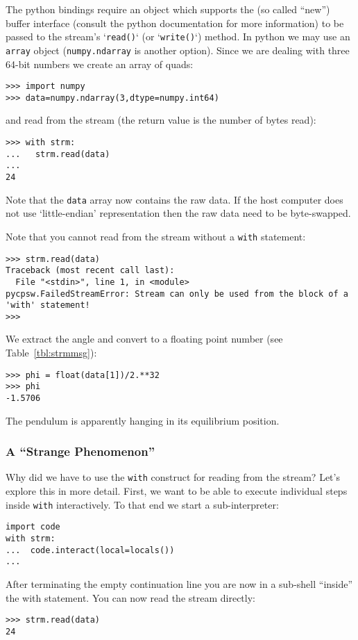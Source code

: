 \documentclass[10pt]{article}
\newcommand{\py}        {python}
\newcommand{\pyt}       {python}
\newcommand{\cod}[1] {{\tt#1}}
\begin{document}
The \py{} bindings require an object which supports the (so called ``new'') buffer
interface (consult the \py{} documentation for more information) to be passed to
the stream's `\cod{read()}` (or `\cod{write()}`) method.
In \pyt{} we may use an \cod{array} object (\cod{numpy.ndarray} is another option).
Since we are dealing with three 64-bit numbers we create an array of quads:
\begin{verbatim}
>>> import numpy
>>> data=numpy.ndarray(3,dtype=numpy.int64)
\end{verbatim}
and read from the stream (the return value is the number of bytes read):
\begin{verbatim}
>>> with strm:
...   strm.read(data)
...
24
\end{verbatim}
Note that the \cod{data} array now contains the raw data. If the host computer does not
use `little-endian' representation then the raw data need to be byte-swapped.

Note that you cannot read from the stream without a \cod{with} statement:
\begin{verbatim}
>>> strm.read(data)
Traceback (most recent call last):
  File "<stdin>", line 1, in <module>
pycpsw.FailedStreamError: Stream can only be used from the block of a 'with' statement!
>>> 
\end{verbatim}

We extract the angle and convert to a floating point number (see
Table~\ref{tbl:strmmsg}):
\begin{verbatim}
>>> phi = float(data[1])/2.**32
>>> phi
-1.5706
\end{verbatim}
The pendulum is apparently hanging in its equilibrium position.

\subsubsection{A ``Strange Phenomenon''}
Why did we have to use the \cod{with} construct for reading from the stream?
Let's explore this in more detail. First, we want to be able to execute
individual steps inside \cod{with} interactively. To that end we start a
sub-interpreter:
\begin{verbatim}
import code
with strm:
...  code.interact(local=locals())
...
\end{verbatim}
After terminating the empty continuation line you are now in a sub-shell
``inside'' the with statement. You can now read the stream directly:
\begin{verbatim}
>>> strm.read(data)
24
\end{verbatim}
\end{document}
